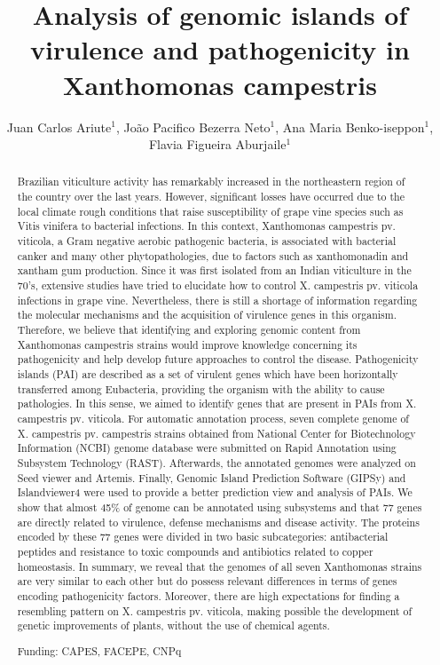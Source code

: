 \documentclass[twoside]{article}
\title{\vspace{-15mm}\fontsize{24pt}{10pt}\selectfont\textbf{Analysis of genomic islands of virulence and pathogenicity in Xanthomonas campestris}} %
\author{Juan Carlos Ariute$^1$, Jo\~ao Pacifico Bezerra Neto$^1$, Ana Maria Benko-iseppon$^1$, Flavia Figueira Aburjaile$^1$}
\affil{1 UFPE, CENTER OF BIOLOGICAL SCIENCES, GENETICS DEPT.\\ }
\date{}
\begin{document}
\maketitle %

\thispagestyle{fancy} %


\begin{abstract}
Brazilian viticulture activity has remarkably increased in the northeastern region of the
country over the last years. However, significant losses have occurred due to the local
climate rough conditions that raise susceptibility of grape vine species such as Vitis
vinifera to bacterial infections. In this context, Xanthomonas campestris pv. viticola, a
Gram negative aerobic pathogenic bacteria, is associated with bacterial canker and
many other phytopathologies, due to factors such as xanthomonadin and xantham gum
production. Since it was first isolated from an Indian viticulture in the 70's, extensive
studies have tried to elucidate how to control X. campestris pv. viticola infections in
grape vine. Nevertheless, there is still a shortage of information regarding the molecular
mechanisms and the acquisition of virulence genes in this organism. Therefore, we
believe that identifying and exploring genomic content from Xanthomonas campestris
strains would improve knowledge concerning its pathogenicity and help develop future
approaches to control the disease. Pathogenicity islands (PAI) are described as a set of
virulent genes which have been horizontally transferred among Eubacteria, providing
the organism with the ability to cause pathologies. In this sense, we aimed to identify
genes that are present in PAIs from X. campestris pv. viticola. For automatic annotation
process, seven complete genome of X. campestris pv. campestris strains obtained from
National Center for Biotechnology Information (NCBI) genome database were submitted
on Rapid Annotation using Subsystem Technology (RAST). Afterwards, the annotated
genomes were analyzed on Seed viewer and Artemis. Finally, Genomic Island
Prediction Software (GIPSy) and Islandviewer4 were used to provide a better prediction
view and analysis of PAIs. We show that almost 45\% of genome can be annotated
using subsystems and that 77 genes are directly related to virulence, defense
mechanisms and disease activity. The proteins encoded by these 77 genes were
divided in two basic subcategories: antibacterial peptides and resistance to toxic
compounds and antibiotics related to copper homeostasis. In summary, we reveal that
the genomes of all seven Xanthomonas strains are very similar to each other but do
possess relevant differences in terms of genes encoding pathogenicity factors.
Moreover, there are high expectations for finding a resembling pattern on X. campestris
pv. viticola, making possible the development of genetic improvements of plants,
without the use of chemical agents.

Funding: CAPES, FACEPE, CNPq
\end{abstract}
\end{document}
